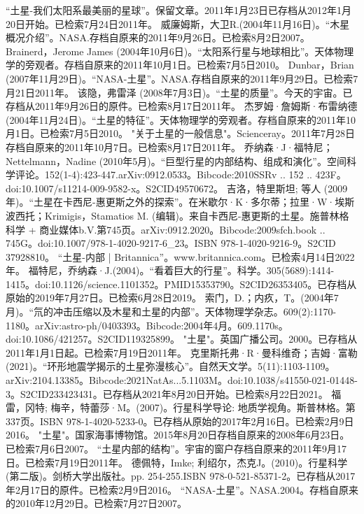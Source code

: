 \begin{enumerate}
 “土星-我们太阳系最美丽的星球”。保留文章。2011年1月23日已存档从2012年1月20日开始。已检索7月24日2011年。
 威廉姆斯，大卫R.(2004年11月16日)。“木星概况介绍”。NASA.存档自原来的2011年9月26日。已检索8月2日2007。
 Brainerd，Jerome James (2004年10月6日)。“太阳系行星与地球相比”。天体物理学的旁观者。存档自原来的2011年10月1日。已检索7月5日2010。
 Dunbar，Brian (2007年11月29日)。“NASA-土星”。NASA.存档自原来的2011年9月29日。已检索7月21日2011年。
 该隐，弗雷泽 (2008年7月3日)。“土星的质量”。今天的宇宙。已存档从2011年9月26日的原件。已检索8月17日2011年。
 杰罗姆·詹姆斯·布雷纳德 (2004年11月24日)。“土星的特征”。天体物理学的旁观者。存档自原来的2011年10月1日。已检索7月5日2010。
 "关于土星的一般信息"。Scienceray。2011年7月28日存档自原来的2011年10月7日。已检索8月17日2011年。
 乔纳森·J·福特尼；Nettelmann，Nadine (2010年5月)。“巨型行星的内部结构、组成和演化”。空间科学评论。152(1-4):423-447.arXiv:0912.0533。Bibcode:2010SSRv .. 152 .. 423F。doi:10.1007/s11214-009-9582-x。S2CID49570672。 
 吉洛，特里斯坦; 等人 (2009年)。“土星在卡西尼-惠更斯之外的探索”。在米歇尔·K·多尔蒂；拉里·W·埃斯波西托；Krimigis，Stamatios M. (编辑)。来自卡西尼-惠更斯的土星。施普林格科学 + 商业媒体b.V.第745页。arXiv:0912.2020。Bibcode:2009sfch.book .. 745G。doi:10.1007/978-1-4020-9217-6_23。ISBN 978-1-4020-9216-9。S2CID 37928810。
 “土星-内部 | Britannica”。www.britannica.com。已检索4月14日2022年。
 福特尼，乔纳森·J.(2004)。“看着巨大的行星”。科学。305(5689):1414-1415。doi:10.1126/science.1101352。PMID15353790。S2CID26353405。已存档从原始的2019年7月27日。已检索6月28日2019。  
 索门，D.；内疚，T。(2004年7月)。“氘的冲击压缩以及木星和土星的内部”。天体物理学杂志。609(2):1170-1180。arXiv:astro-ph/0403393。Bibcode:2004年4月。609.1170s。doi:10.1086/421257。S2CID119325899。 
 "土星"。英国广播公司。2000。已存档从2011年1月1日起。已检索7月19日2011年。
 克里斯托弗·R·曼科维奇；吉姆·富勒 (2021)。“环形地震学揭示的土星弥漫核心”。自然天文学。5(11):1103-1109。arXiv:2104.13385。Bibcode:2021NatAs...5.1103M。doi:10.1038/s41550-021-01448-3。S2CID233423431。已存档从2021年8月20日开始。已检索8月22日2021。 
 福雷，冈特; 梅辛，特蕾莎·M。(2007)。行星科学导论: 地质学视角。斯普林格。第337页。ISBN 978-1-4020-5233-0。已存档从原始的2017年2月16日。已检索2月9日2016。
 "土星"。国家海事博物馆。2015年8月20日存档自原来的2008年6月23日。已检索7月6日2007。
 “土星内部的结构”。宇宙的窗户存档自原来的2011年9月17日。已检索7月19日2011年。
 德佩特，Imke; 利绍尔，杰克J。(2010)。行星科学(第二版)。剑桥大学出版社。pp. 254-255.ISBN 978-0-521-85371-2。已存档从2017年2月17日的原件。已检索2月9日2016。
 “NASA-土星”。NASA.2004。存档自原来的2010年12月29日。已检索7月27日2007。

\end{enumerate}
